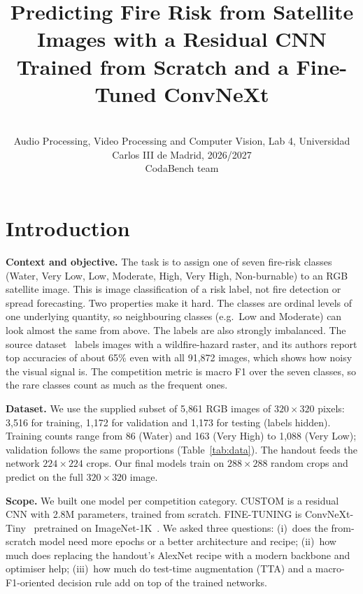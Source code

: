\documentclass[10pt]{article}
\title{\vspace{-1.2cm}Predicting Fire Risk from Satellite Images with a Residual CNN Trained from Scratch and a Fine-Tuned ConvNeXt\vspace{-0.2cm}}
\author{\TBD{Name 1 (NIA)} \and \TBD{Name 2 (NIA)}\\[1pt]
\small Audio Processing, Video Processing and Computer Vision, Lab 4, Universidad Carlos III de Madrid, 2026/2027\\
\small CodaBench team \TBD{ID1\_ID2}}
\date{\vspace{-0.6cm}}
\begin{document}
\maketitle

\section{Introduction}

\textbf{Context and objective.} The task is to assign one of seven fire-risk classes (Water, Very Low, Low, Moderate, High, Very High, Non-burnable) to an RGB satellite image. This is image classification of a risk label, not fire detection or spread forecasting. Two properties make it hard. The classes are ordinal levels of one underlying quantity, so neighbouring classes (e.g.\ Low and Moderate) can look almost the same from above. The labels are also strongly imbalanced. The source dataset~\cite{shen2023firerisk} labels images with a wildfire-hazard raster, and its authors report top accuracies of about 65\% even with all 91{,}872 images, which shows how noisy the visual signal is. The competition metric is macro F1 over the seven classes, so the rare classes count as much as the frequent ones.

\textbf{Dataset.} We use the supplied subset of 5{,}861 RGB images of $320\times320$ pixels: 3{,}516 for training, 1{,}172 for validation and 1{,}173 for testing (labels hidden). Training counts range from 86 (Water) and 163 (Very High) to 1{,}088 (Very Low); validation follows the same proportions (Table~\ref{tab:data}). The handout feeds the network $224\times224$ crops. Our final models train on $288\times288$ random crops and predict on the full $320\times320$ image.

\textbf{Scope.} We built one model per competition category. CUSTOM is a residual CNN with 2.8M parameters, trained from scratch. FINE-TUNING is ConvNeXt-Tiny~\cite{liu2022convnext} pretrained on ImageNet-1K~\cite{deng2009imagenet}. We asked three questions: (i)~does the from-scratch model need more epochs or a better architecture and recipe; (ii)~how much does replacing the handout's AlexNet recipe with a modern backbone and optimiser help; (iii)~how much do test-time augmentation (TTA) and a macro-F1-oriented decision rule add on top of the trained networks.

\end{document}
